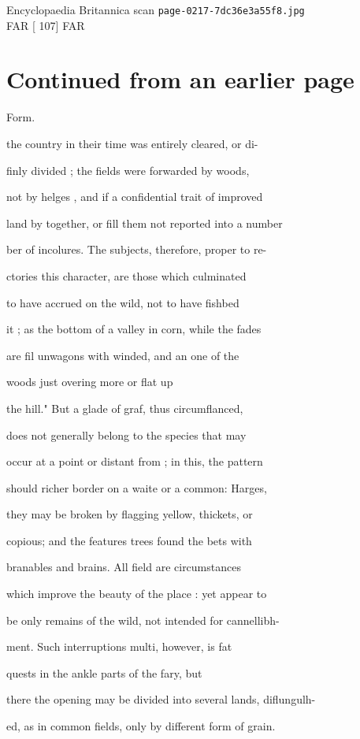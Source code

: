 \documentclass{article}
\begin{document}
\begin{center}
{\Large Encyclopaedia Britannica scan \texttt{page-0217-7dc36e3a55f8.jpg}}\\[0.5em]
FAR [ 107] FAR
\end{center}
\section*{Continued from an earlier page}
Form.

the country in their time was entirely cleared, or di-

finly divided ; the fields were forwarded by woods,

not by helges , and if a confidential trait of improved

land by together, or fill them not reported into a number

ber of incolures. The subjects, therefore, proper to re-

ctories this character, are those which culminated

to have accrued on the wild, not to have fishbed

it ; as the bottom of a valley in corn, while the fades

are fil unwagons with winded, and an one of the

woods just overing more or flat up

the hill." But a glade of graf, thus circumflanced,

does not generally belong to the species that may

occur at a point or distant from ; in this, the pattern

should richer border on a waite or a common: Harges,

they may be broken by flagging yellow, thickets, or

copious; and the features trees found the bets with

branables and brains. All field are circumstances

which improve the beauty of the place : yet appear to

be only remains of the wild, not intended for cannellibh-

ment. Such interruptions multi, however, is fat

quests in the ankle parts of the fary, but

there the opening may be divided into several lands, diflungulh-

ed, as in common fields, only by different form of grain.
\end{document}
